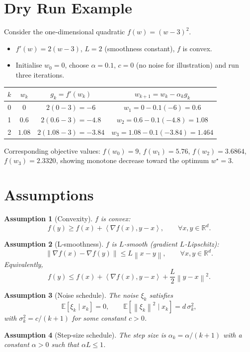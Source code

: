 \documentclass{article}
\newtheorem{assumption}{Assumption}
\newcommand{\E}{\mathbb{E}}
\newcommand{\R}{\mathbb{R}}
\newcommand{\norm}[1]{\left\lVert #1\right\rVert}
\newcommand{\ip}[2]{\left\langle #1,#2\right\rangle}
\begin{document}
\section*{Dry Run Example}
Consider the one‑dimensional quadratic $f(w)=(w-3)^2$.
\begin{itemize}
\item $f'(w)=2(w-3)$, $L=2$ (smoothness constant), $f$ is convex.
\item Initialise $w_0=0$, choose $\alpha=0.1$, $c=0$ (no noise for illustration) and run three iterations.
\end{itemize}
\begin{center}
\begin{tabular}{c|c|c|c}
$k$ & $w_k$ & $g_k= f'(w_k)$ & $w_{k+1}=w_k-\alpha_k g_k$\\ \hline
0 & $0$ & $2(0-3)=-6$ & $w_1=0-0.1(-6)=0.6$ \\
1 & $0.6$ & $2(0.6-3)=-4.8$ & $w_2=0.6-0.1(-4.8)=1.08$ \\
2 & $1.08$ & $2(1.08-3)=-3.84$ & $w_3=1.08-0.1(-3.84)=1.464$ 
\end{tabular}
\end{center}
Corresponding objective values: $f(w_0)=9$, $f(w_1)=5.76$, $f(w_2)=3.6864$, $f(w_3)=2.3320$,
showing monotone decrease toward the optimum $w^\star=3$.

\newpage
\section*{Assumptions}
\begin{assumption}[Convexity]\label{as:conv}
$f$ is convex:
\[
f(y)\ge f(x)+\ip{\nabla f(x)}{y-x},\qquad\forall x,y\in\R^{d}.
\]
\end{assumption}
\begin{assumption}[L‑smoothness]\label{as:smooth}
$f$ is $L$‑smooth (gradient $L$‑Lipschitz):
\[
\norm{\nabla f(x)-\nabla f(y)}\le L\norm{x-y},\qquad\forall x,y\in\R^{d}.
\]
Equivalently,
\[
f(y)\le f(x)+\ip{\nabla f(x)}{y-x}+\frac{L}{2}\norm{y-x}^{2}.
\]
\end{assumption}
\begin{assumption}[Noise schedule]\label{as:noise}
The noise $\xi_k$ satisfies
\[
\E[\xi_k\mid x_k]=0,\qquad 
\E[\norm{\xi_k}^{2}\mid x_k]=d\,\sigma_k^{2},
\]
with $\sigma_k^{2}=c/(k+1)$ for some constant $c>0$.
\end{assumption}
\begin{assumption}[Step‑size schedule]\label{as:step}
The step size is $\alpha_k=\alpha/(k+1)$ with a constant $\alpha>0$ such that $\alpha L\le 1$.
\end{assumption}
\end{document}
